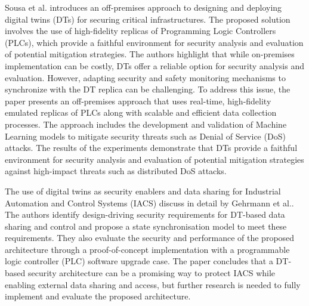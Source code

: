 

Sousa et al.\cite{sousaELEGANTSecurityCritical2021} introduces an off-premises approach to designing and deploying digital twins (DTs) for securing critical infrastructures. The proposed solution involves the use of high-fidelity replicas of Programming Logic Controllers (PLCs), which provide a faithful environment for security analysis and evaluation of potential mitigation strategies. The authors highlight that while on-premises implementation can be costly, DTs offer a reliable option for security analysis and evaluation. However, adapting security and safety monitoring mechanisms to synchronize with the DT replica can be challenging. To address this issue, the paper presents an off-premises approach that uses real-time, high-fidelity emulated replicas of PLCs along with scalable and efficient data collection processes. The approach includes the development and validation of Machine Learning models to mitigate security threats such as Denial of Service (DoS) attacks. The results of the experiments demonstrate that DTs provide a faithful environment for security analysis and evaluation of potential mitigation strategies against high-impact threats such as distributed DoS attacks.

The use of digital twins as security enablers and data sharing for Industrial Automation and Control Systems (IACS) discuss in detail by Gehrmann et al.\cite{gehrmannDigitalTwinBased2020}. The authors identify design-driving security requirements for DT-based data sharing and control and propose a state synchronisation model to meet these requirements. They also evaluate the security and performance of the proposed architecture through a proof-of-concept implementation with a programmable logic controller (PLC) software upgrade case. The paper concludes that a DT-based security architecture can be a promising way to protect IACS while enabling external data sharing and access, but further research is needed to fully implement and evaluate the proposed architecture.

